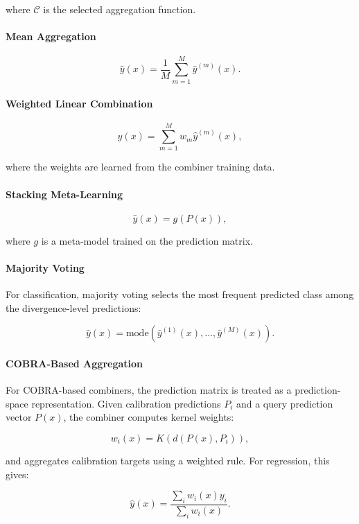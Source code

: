 where $\mathcal{C}$ is the selected aggregation function.

\paragraph{Mean Aggregation}

\[
    \hat{y}(x) = \frac{1}{M}\sum_{m=1}^{M}\hat{y}^{(m)}(x).
\]

\paragraph{Weighted Linear Combination}

\[
    \hat{y}(x) = \sum_{m=1}^{M} w_m \hat{y}^{(m)}(x),
\]

where the weights are learned from the combiner training data.

\paragraph{Stacking Meta-Learning}

\[
    \hat{y}(x) = g(P(x)),
\]

where $g$ is a meta-model trained on the prediction matrix.

\paragraph{Majority Voting}

For classification, majority voting selects the most frequent predicted class among the divergence-level predictions:

\[
    \hat{y}(x) = \mathrm{mode}\left(\hat{y}^{(1)}(x), \dots, \hat{y}^{(M)}(x)\right).
\]

\paragraph{COBRA-Based Aggregation}

For COBRA-based combiners, the prediction matrix is treated as a prediction-space representation. Given calibration predictions $P_i$ and a query prediction vector $P(x)$, the combiner computes kernel weights:

\[
    w_i(x) = K\left(d(P(x), P_i)\right),
\]

and aggregates calibration targets using a weighted rule. For regression, this gives:

\[
    \hat{y}(x)
    =
    \frac{\sum_i w_i(x)y_i}{\sum_i w_i(x)}.
\]

